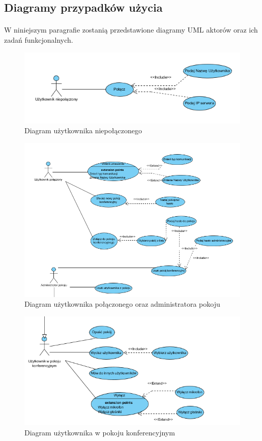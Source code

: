 \documentclass{article}
\begin{document}
	\subsection{Diagramy przypadków użycia}
	\paragraph{} W niniejszym paragrafie zostanią przedstawione diagramy UML aktorów oraz ich zadań funkcjonalnych.
	\begin{figure}[H]
		\centering
		\includegraphics[scale=0.9]{UserNP}
		\caption[]{Diagram użytkownika niepołączonego}
		\label{fig:DUN}
	\end{figure}
	\begin{figure}[H]
		\centering
		\includegraphics[scale=0.9]{UserPiAdm}
		\caption[]{Diagram użytkownika połączonego oraz administratora pokoju}
		\label{fig:DUP}
	\end{figure}
	\begin{figure}[H]
		\centering
		\includegraphics[scale=0.9]{UserPK}
		\caption[]{Diagram użytkownika w pokoju konferencyjnym}
		\label{fig:DUW}
	\end{figure}
\end{document}
